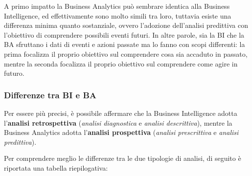 A primo impatto la Business Analytics può sembrare identica alla Business Intelligence, ed effettivamente sono molto simili tra loro, tuttavia esiste una differenza minima quanto sostanziale, ovvero l'adozione dell'analisi predittiva con l'obiettivo di comprendere possibili eventi futuri. In altre parole, sia la BI che la BA sfruttano i dati di eventi e azioni passate ma lo fanno con scopi differenti: la prima focalizza il proprio obiettivo sul comprendere cosa sia accaduto in passato, mentre la seconda focalizza il proprio obiettivo sul comprendere come agire in futuro.\cite{talend_bi_vs_ba} 


\subsubsection{Differenze tra BI e BA}
Per essere più precisi, è possibile affermare che la Business Intelligence adotta l'\textbf{analisi retrospettiva} (\textit{analisi diagnostica} e \textit{analisi descrittiva}), mentre la Business Analytics adotta l'\textbf{analisi prospettiva} (\textit{analisi prescrittiva} e \textit{analisi predittiva}).\cite{researchgate_bi_and_ba_analytics}

Per comprendere meglio le differenze tra le due tipologie di analisi, di seguito è riportata una tabella riepilogativa:\cite{knowledgehut_bi_vs_ba}

